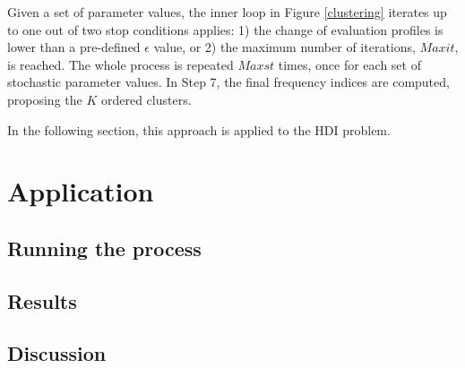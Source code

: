 \documentclass[]{elsarticle}
\theoremstyle{definition}
\begin{document}
Given a set of parameter values, the inner loop in Figure \ref{clustering} iterates up to one out of two stop conditions applies: 1) the change of evaluation profiles is  lower than a pre-defined $\epsilon$ value, or 2) the maximum number of iterations, $Maxit$,  is reached.  The whole process is repeated $Maxst$ times, once for each set of stochastic parameter values. In Step 7, the final frequency indices are computed, proposing the $K$ ordered clusters.


  

In the following section, this approach is applied to the HDI problem.





\section{Application}\label{application}





\subsection{Running the process}



\subsection{Results}


\subsection{Discussion}
\end{document}
